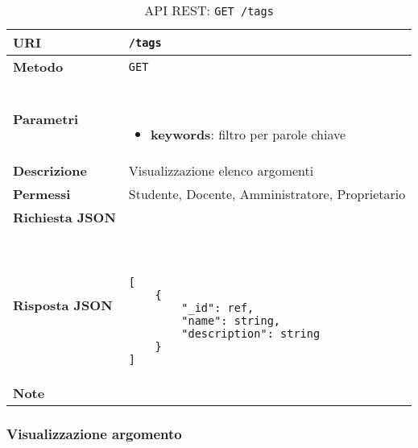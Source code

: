         \begin{table}[H]
            \begin{center}
                \begin{tabular}{p{} p{}}
                    \toprule
                    \textbf{URI} & \texttt{/tags} \\ \midrule
                    \textbf{Metodo} & \texttt{GET} \\ \midrule
                    \textbf{Parametri} & \
                        \begin{itemize}
                            \item \textbf{keywords}: filtro per parole chiave
                        \end{itemize}
                        \\ \midrule
                    \textbf{Descrizione} & Visualizzazione elenco argomenti \\ \midrule
                    \textbf{Permessi} & Studente, Docente, Amministratore, Proprietario  \\ \midrule
                    \textbf{Richiesta JSON} & \\ \midrule
                    \textbf{Risposta JSON} & \
                        \begin{lstlisting}[basicstyle={\ttfamily}]
[
    {
        "_id": ref,
        "name": string,
       	"description": string
    }
]
                        \end{lstlisting}
                        \\ \midrule
                    \textbf{Note} & \\
                    \bottomrule
                \end{tabular}
                \caption{API REST: \texttt{GET /tags}}
            \end{center}
        \end{table}

    \subsubsection{Visualizzazione argomento}

